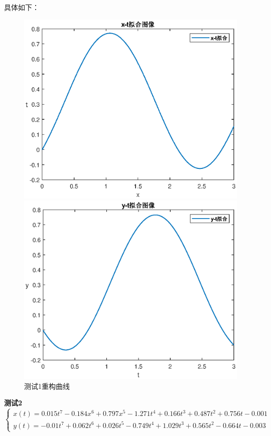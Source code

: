 \documentclass[withoutpreface,bwprint]{cumcmthesis}
\begin{document}
具体如下：
\begin{figure}[!h]  
\centering  
\begin{minipage}{.5\textwidth}  
  \centering  
  \includegraphics[width=.9\linewidth]{1x-t拟合.eps}  
\end{minipage}%
\begin{minipage}{.5\textwidth}  
  \centering  
  \includegraphics[width=.9\linewidth]{1y-t拟合.eps}  
\end{minipage}  
\caption{测试1重构曲线}  
\end{figure}  

\textbf{测试2}
\begin{equation}
\left\{\begin{array}{l}
x(t)=0.015 t^7-0.184 x^6+0.797 x^5-1.271 t^4+0.166 t^3+0.487 t^2+0.756 t-0.001 \\
y(t)=-0.01 t^7+0.062 t^6+0.026 t^5-0.749 t^4+1.029 t^3+0.565 t^2-0.664 t-0.003
\end{array}\right.
\end{equation}
\end{document}
